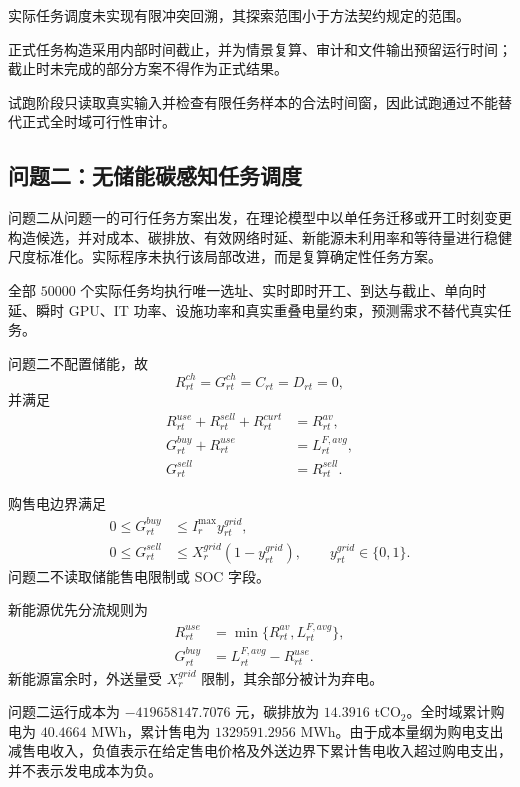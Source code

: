 实际任务调度未实现有限冲突回溯，其探索范围小于方法契约规定的范围。

正式任务构造采用内部时间截止，并为情景复算、审计和文件输出预留运行时间；截止时未完成的部分方案不得作为正式结果。

试跑阶段只读取真实输入并检查有限任务样本的合法时间窗，因此试跑通过不能替代正式全时域可行性审计。

\subsection{问题二：无储能碳感知任务调度}

问题二从问题一的可行任务方案出发，在理论模型中以单任务迁移或开工时刻变更构造候选，并对成本、碳排放、有效网络时延、新能源未利用率和等待量进行稳健尺度标准化。实际程序未执行该局部改进，而是复算确定性任务方案。

全部 $50000$ 个实际任务均执行唯一选址、实时即时开工、到达与截止、单向时延、瞬时 GPU、IT 功率、设施功率和真实重叠电量约束，预测需求不替代真实任务。

问题二不配置储能，故
\begin{equation}
R_{rt}^{ch}=G_{rt}^{ch}=C_{rt}=D_{rt}=0,
\end{equation}
并满足
\begin{align}
R_{rt}^{use}+R_{rt}^{sell}+R_{rt}^{curt}&=R_{rt}^{av},\\
G_{rt}^{buy}+R_{rt}^{use}&=L_{rt}^{F,avg},\\
G_{rt}^{sell}&=R_{rt}^{sell}.
\end{align}

购售电边界满足
\begin{align}
0\le G_{rt}^{buy}&\le I_r^{\max}y_{rt}^{grid},\\
0\le G_{rt}^{sell}&\le X_r^{grid}(1-y_{rt}^{grid}),
\qquad y_{rt}^{grid}\in\{0,1\}.
\end{align}
问题二不读取储能售电限制或 SOC 字段。

新能源优先分流规则为
\begin{align}
R_{rt}^{use}&=\min\{R_{rt}^{av},L_{rt}^{F,avg}\},\\
G_{rt}^{buy}&=L_{rt}^{F,avg}-R_{rt}^{use}.
\end{align}
新能源富余时，外送量受 $X_r^{grid}$ 限制，其余部分被计为弃电。

问题二运行成本为 $-419658147.7076$ 元，碳排放为 $14.3916$ tCO$_2$。全时域累计购电为 $40.4664$ MWh，累计售电为 $1329591.2956$ MWh。由于成本量纲为购电支出减售电收入，负值表示在给定售电价格及外送边界下累计售电收入超过购电支出，并不表示发电成本为负。


